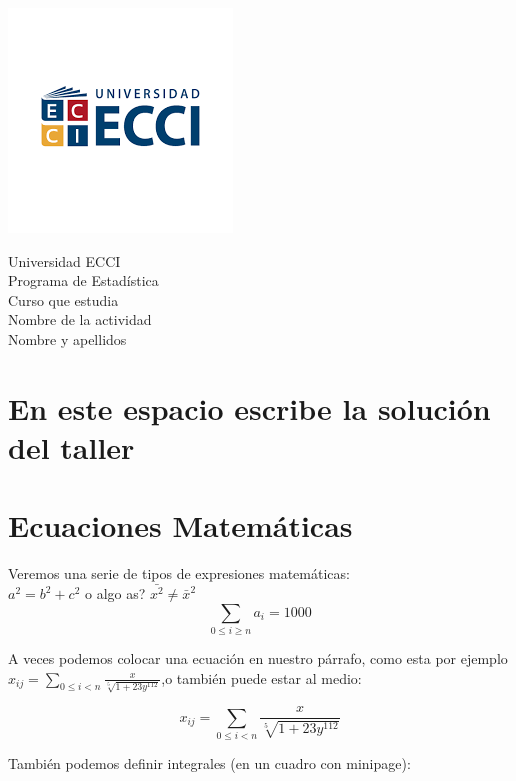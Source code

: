 \documentclass[13 pts]{article}
\theoremstyle{definition}
\begin{document}
\voffset-2.5cm
\parbox{6cm}{\includegraphics [scale=0.8]{ecci.png} }\parbox{8cm}{{Universidad ECCI}\\{Programa de Estadística}\\{Curso que estudia}\\{Nombre de la actividad}\\{Nombre y apellidos} \bf  }

\vspace{-2.0cm}


\section*{En este espacio escribe la solución del taller}

\section*{Ecuaciones Matemáticas}
\label{sec:escuaciones}
Veremos una serie de tipos de expresiones matemáticas:\\

\(a^2 = b^2 + c^2\) o algo as? \(\bar{x^2} \ne \bar{x}^2\) \\

\begin{equation}
  \label{eq:suma}
  \sum_{0 \le i \ge  n} a_i = 1000
\end{equation}

A veces podemos colocar una ecuación en nuestro párrafo, como esta
 por ejemplo $\displaystyle x_{ij} = \sum_{0 \le i < n}\frac{x}{\sqrt[5]{1 + 23y^{112}}}$,o también puede estar al medio:
 
\[x_{ij} = \sum_{0 \le i < n}\frac{x}{\sqrt[5]{1 + 23y^{112}}}\]

También podemos definir integrales (en un cuadro con minipage): 

\\[1em]
\end{document}
